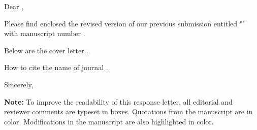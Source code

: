 \thispagestyle{empty}
\noindent Dear \editorname,


Please find enclosed the revised version of our previous submission entitled "\thetitle" with manuscript number \manuscript.

Below are the cover letter...

How to cite the name of journal \journal.


\vspace{8em}

\noindent Sincerely,

\noindent\theauthor

\vfill
\textbf{Note:} To improve the readability of this response letter, all editorial and reviewer comments are typeset in boxes. Quotations from the manuscript are in color. Modifications in the manuscript are also highlighted in color.